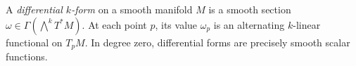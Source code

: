 
A \emph{differential $k$-form} on a smooth manifold $M$ is a smooth section $\omega\in\Gamma(\bigwedge^kT^*M)$. At each point $p$, its value $\omega_p$ is an alternating $k$-linear functional on $T_pM$. In degree zero, differential forms are precisely smooth scalar functions.
